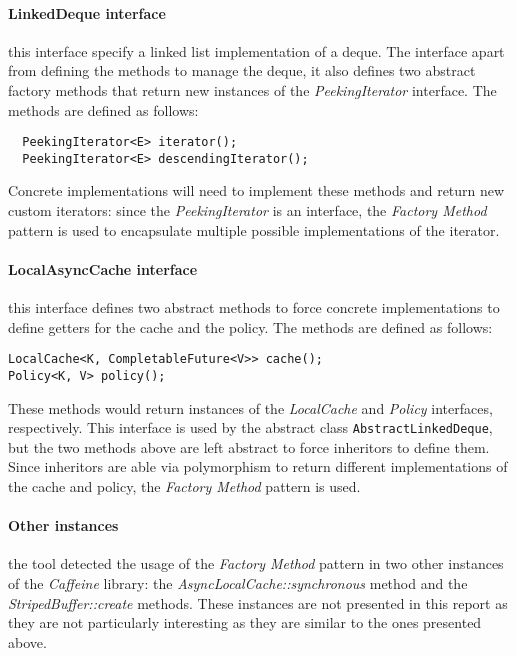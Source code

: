 \paragraph{LinkedDeque interface} this interface specify a linked list implementation of a deque. The interface apart from defining the methods to manage the deque, it also defines two abstract factory methods that return new instances of the \textit{PeekingIterator} interface. The methods are defined as follows:

\begin{lstlisting}
  PeekingIterator<E> iterator();
  PeekingIterator<E> descendingIterator();
\end{lstlisting}

\noindent Concrete implementations will need to implement these methods and return new custom iterators: since the \textit{PeekingIterator} is an interface, the \textit{Factory Method} pattern is used to encapsulate multiple possible implementations of the iterator.

\paragraph{LocalAsyncCache interface} this interface defines two abstract methods to force concrete implementations to define getters for the cache and the policy. The methods are defined as follows:

\begin{lstlisting}
LocalCache<K, CompletableFuture<V>> cache();
Policy<K, V> policy();
\end{lstlisting}

\noindent These methods would return instances of the \textit{LocalCache} and \textit{Policy} interfaces, respectively. This interface is used by the abstract class \texttt{AbstractLinkedDeque}, but the two methods above are left abstract to force inheritors to define them. Since inheritors are able via polymorphism to return different implementations of the cache and policy, the \textit{Factory Method} pattern is used.

\paragraph{Other instances} the tool detected the usage of the \textit{Factory Method} pattern in two other instances of the \textit{Caffeine} library: the \textit{AsyncLocalCache::synchronous} method and the \textit{StripedBuffer::create} methods. These instances are not presented in this report as they are not particularly interesting as they are similar to the ones presented above.

